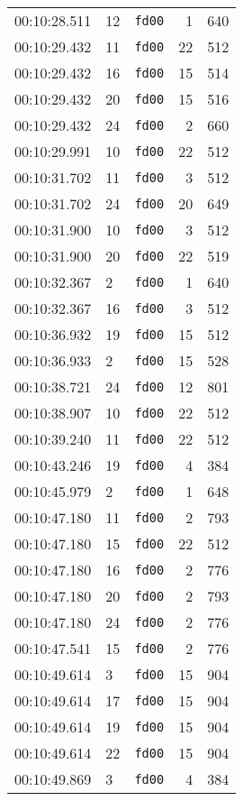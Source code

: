 \documentclass{article}
\begin{document}
\begin{longtable}{lllrr}
00:10:28.511 & 12 & \texttt{fd00} & 1 & 640 \\
00:10:29.432 & 11 & \texttt{fd00} & 22 & 512 \\
00:10:29.432 & 16 & \texttt{fd00} & 15 & 514 \\
00:10:29.432 & 20 & \texttt{fd00} & 15 & 516 \\
00:10:29.432 & 24 & \texttt{fd00} & 2 & 660 \\
00:10:29.991 & 10 & \texttt{fd00} & 22 & 512 \\
00:10:31.702 & 11 & \texttt{fd00} & 3 & 512 \\
00:10:31.702 & 24 & \texttt{fd00} & 20 & 649 \\
00:10:31.900 & 10 & \texttt{fd00} & 3 & 512 \\
00:10:31.900 & 20 & \texttt{fd00} & 22 & 519 \\
00:10:32.367 & 2 & \texttt{fd00} & 1 & 640 \\
00:10:32.367 & 16 & \texttt{fd00} & 3 & 512 \\
00:10:36.932 & 19 & \texttt{fd00} & 15 & 512 \\
00:10:36.933 & 2 & \texttt{fd00} & 15 & 528 \\
00:10:38.721 & 24 & \texttt{fd00} & 12 & 801 \\
00:10:38.907 & 10 & \texttt{fd00} & 22 & 512 \\
00:10:39.240 & 11 & \texttt{fd00} & 22 & 512 \\
00:10:43.246 & 19 & \texttt{fd00} & 4 & 384 \\
00:10:45.979 & 2 & \texttt{fd00} & 1 & 648 \\
00:10:47.180 & 11 & \texttt{fd00} & 2 & 793 \\
00:10:47.180 & 15 & \texttt{fd00} & 22 & 512 \\
00:10:47.180 & 16 & \texttt{fd00} & 2 & 776 \\
00:10:47.180 & 20 & \texttt{fd00} & 2 & 793 \\
00:10:47.180 & 24 & \texttt{fd00} & 2 & 776 \\
00:10:47.541 & 15 & \texttt{fd00} & 2 & 776 \\
00:10:49.614 & 3 & \texttt{fd00} & 15 & 904 \\
00:10:49.614 & 17 & \texttt{fd00} & 15 & 904 \\
00:10:49.614 & 19 & \texttt{fd00} & 15 & 904 \\
00:10:49.614 & 22 & \texttt{fd00} & 15 & 904 \\
00:10:49.869 & 3 & \texttt{fd00} & 4 & 384 \\

\end{longtable}
\end{document}
